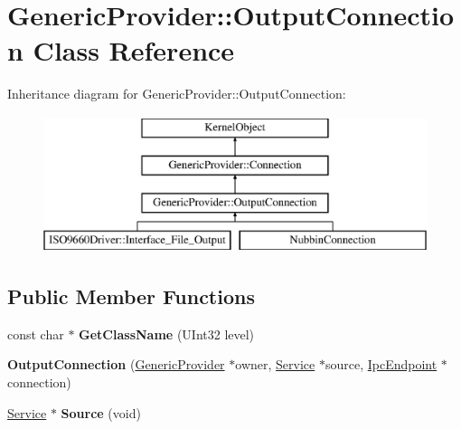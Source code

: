 \hypertarget{class_generic_provider_1_1_output_connection}{}\section{Generic\+Provider\+:\+:Output\+Connection Class Reference}
\label{class_generic_provider_1_1_output_connection}
Inheritance diagram for Generic\+Provider\+:\+:Output\+Connection\+:\begin{figure}[H]
\begin{center}
\leavevmode
\includegraphics[height=4.000000cm]{class_generic_provider_1_1_output_connection}
\end{center}
\end{figure}
\subsection*{Public Member Functions}
\begin{DoxyCompactItemize}
\item 
\mbox{\label{class_generic_provider_1_1_output_connection_a68138f5c62866da3f7a82d9c649d516c}} 
const char $\ast$ {\bfseries Get\+Class\+Name} (U\+Int32 level)
\item 
\mbox{\label{class_generic_provider_1_1_output_connection_a55066e60c8782608796cf21263ba18eb}} 
{\bfseries Output\+Connection} (\hyperlink{class_generic_provider}{Generic\+Provider} $\ast$owner, \hyperlink{class_generic_provider_1_1_service}{Service} $\ast$source, \hyperlink{class_ipc_endpoint}{Ipc\+Endpoint} $\ast$connection)
\item 
\mbox{\label{class_generic_provider_1_1_output_connection_aae8c38fef14fe035007a2ca35afddcb8}} 
\hyperlink{class_generic_provider_1_1_service}{Service} $\ast$ {\bfseries Source} (void)
\end{DoxyCompactItemize}
